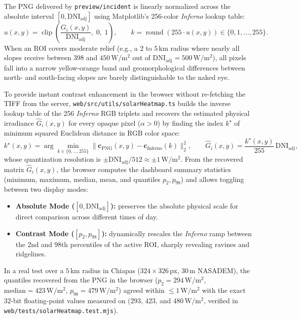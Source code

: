 \documentclass[11pt,a4paper]{article}
\newcommand{\src}[1]{\nolinkurl{#1}}
\newcommand{\unit}[1]{\mathrm{#1}}
\begin{document}
\begin{ejemplo}
The PNG delivered by \texttt{preview/incident} is linearly normalized across the absolute interval
$[0, \mathrm{DNI}_{\mathrm{adj}}]$ using Matplotlib's 256-color \emph{Inferno} lookup table:
\begin{equation}
  u(x,y) = \operatorname{clip}\!\left(\frac{G_i(x,y)}{\mathrm{DNI}_{\mathrm{adj}}},\; 0,\; 1\right),
  \qquad
  k = \operatorname{round}(255 \cdot u(x,y)) \in \{0, 1, \ldots, 255\}.
  \label{eq:solar-lut-forward}
\end{equation}
When an ROI covers moderate relief (e.g., a $2$ to $5\,\unit{km}$ radius where nearly all slopes receive between
$398$ and $450\,\unit{W/m^2}$ out of $\mathrm{DNI}_{\mathrm{adj}} = 500\,\unit{W/m^2}$), all pixels fall into a
narrow yellow-orange band and geomorphological differences between north- and south-facing slopes are barely
distinguishable to the naked eye.

To provide instant contrast enhancement in the browser without re-fetching the TIFF from the server,
\src{web/src/utils/solarHeatmap.ts} builds the inverse lookup table of the 256 \emph{Inferno} RGB triplets and
recovers the estimated physical irradiance $\hat{G}_i(x,y)$ for every opaque pixel ($\alpha > 0$) by finding the
index $k^\star$ of minimum squared Euclidean distance in RGB color space:
\begin{equation}
  k^\star(x,y) = \arg\min_{k\in\{0,\ldots,255\}} \bigl\|\mathbf{c}_{\mathrm{PNG}}(x,y) - \mathbf{c}_{\mathrm{Inferno}}(k)\bigr\|_2^2,
  \qquad
  \hat{G}_i(x,y) = \frac{k^\star(x,y)}{255}\,\mathrm{DNI}_{\mathrm{adj}},
  \label{eq:solar-lut-inverse}
\end{equation}
whose quantization resolution is $\pm \mathrm{DNI}_{\mathrm{adj}} / 512 \approx \pm 1\,\unit{W/m^2}$. From the
recovered matrix $\hat{G}_i(x,y)$, the browser computes the dashboard summary statistics (minimum, maximum,
median, mean, and quantiles $p_2, p_{98}$) and allows toggling between two display modes:
\begin{itemize}
  \item \textbf{Absolute Mode ($[0, \mathrm{DNI}_{\mathrm{adj}}]$):} preserves the absolute physical scale for
        direct comparison across different times of day.
  \item \textbf{Contrast Mode ($[p_2, p_{98}]$):} dynamically rescales the \emph{Inferno} ramp between the 2nd
        and 98th percentiles of the active ROI, sharply revealing ravines and ridgelines.
\end{itemize}
In a real test over a $5\,\unit{km}$ radius in Chiapas ($324\times 326\,\text{px}$, $30\,\unit{m}$ NASADEM), the
quantiles recovered from the PNG in the browser ($p_2 = 294\,\unit{W/m^2}$, $\text{median} = 423\,\unit{W/m^2}$,
$p_{98} = 479\,\unit{W/m^2}$) agreed within $\le 1\,\unit{W/m^2}$ with the exact 32-bit floating-point values
measured on  ($293$, $423$, and $480\,\unit{W/m^2}$, verified in
\src{web/tests/solarHeatmap.test.mjs}).
\end{ejemplo}
\end{document}
